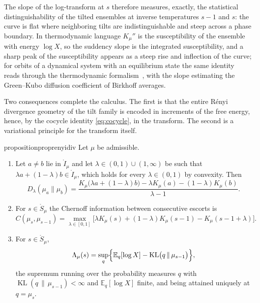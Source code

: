 \documentclass[sn-mathphys-num]{sn-jnl}
\theoremstyle{thmstyleone}%
\theoremstyle{thmstyletwo}%
\theoremstyle{thmstylethree}%
\theoremstyle{thmstyleone}%
\providecommand{\E}{\mathbb{E}}
\providecommand{\KL}{\operatorname{KL}}
\begin{document}
	
	The slope of the log-transform at $s$ therefore measures, exactly,
	the statistical distinguishability of the tilted ensembles at
	inverse temperatures $s-1$ and $s$: the curve is flat where
	neighboring tilts are indistinguishable and steep across a phase
	boundary. In thermodynamic language $K_\mu''$ is the
	susceptibility of the ensemble with energy $\log X$, so the
	suddency slope is the integrated susceptibility, and a sharp peak
	of the susceptibility appears as a steep rise and inflection of the
	curve; for orbits of a dynamical system with an equilibrium state
	the same identity reads through the thermodynamic
	formalism~\cite{ruelle2004}, with the slope estimating the
	Green--Kubo diffusion coefficient of Birkhoff averages.
	
	Two consequences complete the calculus. The first is that the entire
	R\'enyi divergence geometry of the tilt family is encoded in
	increments of the free energy, hence, by the cocycle identity
	\eqref{eq:cocycle}, in the transform. The second is a variational
	principle for the transform itself.
	
	\begin{restatable}{proposition}{proprenyidiv}\label{prop:renyidiv}
		Let $\mu$ be admissible.
		\begin{enumerate}[label=\textup{(\roman*)},leftmargin=2.2em]
			\item Let $a\neq b$ lie in $\mathring I_\mu$ and let
			$\lambda\in(0,1)\cup(1,\infty)$ be such that
			$\lambda a+(1-\lambda)b\in\mathring I_\mu$, which holds
			for every $\lambda\in(0,1)$ by convexity. Then
			\begin{equation}\label{eq:renyidiv}
				D_\lambda(\mu_a\|\mu_b)
				=\frac{K_\mu\bigl(\lambda a+(1-\lambda)b\bigr)
					-\lambda K_\mu(a)-(1-\lambda)K_\mu(b)}{\lambda-1} .
			\end{equation}
			\item For $s\in\mathring S_\mu$ the Chernoff information
			between consecutive escorts is
			\begin{equation}\label{eq:chernoff}
				C(\mu_s,\mu_{s-1})=\max_{\lambda\in[0,1]}
				\bigl[\lambda K_\mu(s)+(1-\lambda)K_\mu(s-1)
				-K_\mu(s-1+\lambda)\bigr].
			\end{equation}
			\item For $s\in\mathring S_\mu$,
			\begin{equation}\label{eq:dv}
				\Lambda_\mu(s)
				=\sup_{q}\Bigl\{\E_q[\log X]
				-\KL\bigl(q\,\|\,\mu_{s-1}\bigr)\Bigr\},
			\end{equation}
			the supremum running over the probability measures $q$ with
			$\KL(q\,\|\,\mu_{s-1})<\infty$ and $\E_q[\log X]$
			finite, and being attained uniquely at $q=\mu_s$.
		\end{enumerate}
	\end{restatable}
	
\end{document}
